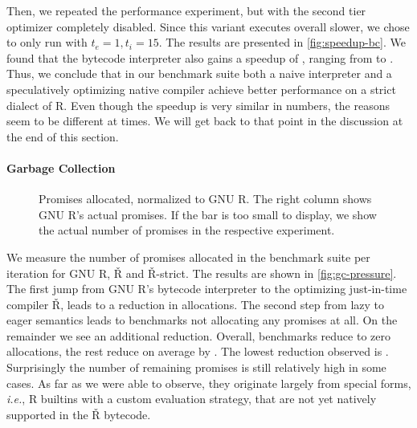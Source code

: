 \documentclass[review,nonacm,screen,acmsmall,anonymous=true]{acmart}
\renewcommand{\Rsh}{{\sf\v R}\xspace}
\newcommand{\ie}{\emph{i.e.},\xspace}
\begin{document}
Then, we repeated the performance experiment, but with the second tier
optimizer completely disabled. Since this variant executes overall \rshBCSlowdown
slower, we chose to only run with $t_e = 1, t_i = 15$.
The results are presented in \autoref{fig:speedup-bc}. We found that the bytecode
interpreter also gains a speedup of \speedupBCRshStrict, ranging from
\speedupBCRshStrictMin to \speedupBCRshStrictMax.
%
Thus, we conclude that in our benchmark suite both a naive interpreter and a speculatively
optimizing native compiler achieve better performance on a strict dialect of R.
Even though the speedup is very similar in numbers, the reasons seem to be
different at times. We will get back to that point in the discussion at the end of
this section.

\paragraph{Garbage Collection}

\begin{figure}[h]
  \centering
  
  \caption{Promises allocated, normalized to GNU R. The right column shows GNU R's actual promises. If the bar is too small to display, we show the actual number of promises in the respective experiment.}
  \label{fig:gc-pressure}
\end{figure}

We measure the number of promises allocated in the
benchmark suite per iteration for GNU R, \Rsh and \Rsh-strict. The results are shown in
\autoref{fig:gc-pressure}. The first jump from GNU R's bytecode interpreter to
the optimizing just-in-time compiler \Rsh, leads to a \promiseAlocationReductionGnurRsh
reduction in allocations. The second step
from lazy to eager semantics leads to \promiseAlocationReductionRshStrictToZero
benchmarks not allocating any promises at all. On the remainder we see an additional
\promiseAlocationReductionRshStrict reduction.
Overall, \promiseAlocationReductionRshStrictToZero benchmarks reduce to zero
allocations, the rest reduce on average by \promiseAlocationReductionGnurRshStrict.
The lowest reduction observed is
\promiseAlocationReductionGnurRshStrictMin.
Surprisingly the number of remaining promises is
still relatively high in some cases. As far as we were able to observe, they
originate largely from special forms, \ie R builtins with a custom evaluation
strategy, that are not yet natively supported in the \Rsh bytecode.
\end{document}
